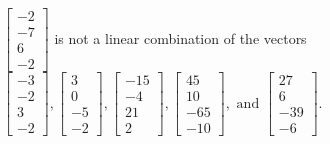 \begin{exercise}
\begin{exerciseStatement}
  \end{exerciseStatement}
  \begin{exerciseAnswer}
   \(\left[\begin{array}{c}
-2 \\
-7 \\
6 \\
-2
\end{array}\right]\) 
  	 is not  
	a linear combination of the vectors \(\left[\begin{array}{c}
-3 \\
-2 \\
3 \\
-2
\end{array}\right] , \left[\begin{array}{c}
3 \\
0 \\
-5 \\
-2
\end{array}\right] , \left[\begin{array}{c}
-15 \\
-4 \\
21 \\
2
\end{array}\right] , \left[\begin{array}{c}
45 \\
10 \\
-65 \\
-10
\end{array}\right] , \text{ and } \left[\begin{array}{c}
27 \\
6 \\
-39 \\
-6
\end{array}\right]\).

	
  


  \end{exerciseAnswer}
\end{exercise}